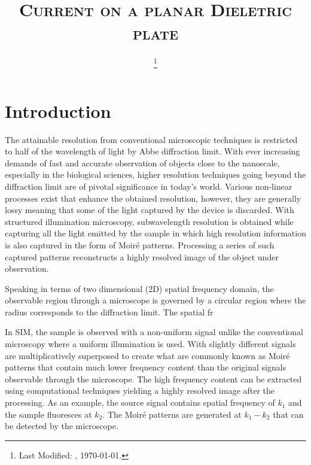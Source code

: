 \documentclass[11pt]{article}
\renewcommand{\^}{\hat}  %
\begin{document}
\title{\textsc{Current on a planar Dieletric plate}\\}
\date{\footnote{Last Modified: \currenttime, \today.}}
\maketitle

\section*{Introduction}

The attainable resolution from conventional microscopic techniques is restricted to half of the wavelength of light by Abbe diffraction limit. With ever increasing demands of fast and accurate observation of objects close to the nanoscale, especially in the biological sciences, higher resolution techniques going beyond the diffraction limit are of pivotal significance in today's world. Various non-linear processes exist that enhance the obtained resolution, however, they are generally lossy meaning that some of the light captured by the device is discarded. With structured illumination microscopy, subwavelength resolution is obtained while capturing all the light emitted by the sample in which high resolution information is also captured in the form of Moir\'e patterns. Processing a series of such captured patterns reconstructs a highly resolved image of the object under observation.

Speaking in terms of two dimensional (2D) spatial frequency domain, the observable region through a microscope is governed by a circular region where the radius corresponds to the diffraction limit. The spatial fr

In SIM, the sample is observed with a non-uniform signal unlike the conventional microscopy where a uniform illumination is used. With slightly different signals are multiplicatively superposed to create what are commonly known as Moir\'e patterns that contain much lower frequency content than the original signals observable through the microscope. The high frequency content can be extracted using computational techniques yielding a highly resolved image after the processing. As an example, the source signal contains spatial frequency of $k_1$ and the sample fluoresces at $k_2$. The Moir\'e patterns are generated at $k_1 - k_2$ that can be detected by the microscope.
\end{document}
